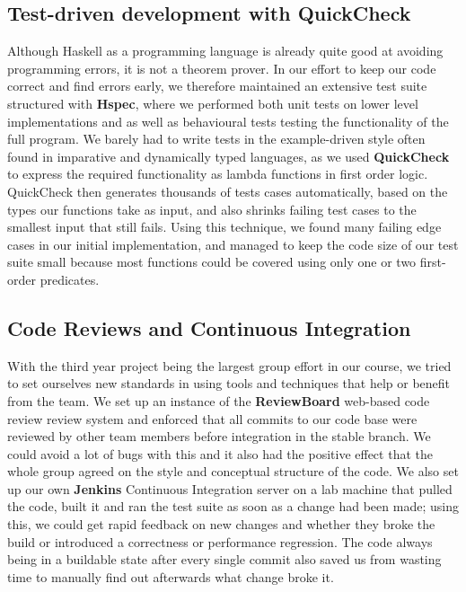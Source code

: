 \subsection*{Test-driven development with QuickCheck}
Although Haskell as a programming language is already quite good at avoiding programming errors, it is not a theorem prover.
In our effort to keep our code correct and find errors early, we therefore maintained an extensive test suite structured with \textbf{Hspec}, where we performed both unit tests on lower level implementations and as well as behavioural tests testing the functionality of the full program.
We barely had to write tests in the example-driven style often found in imparative and dynamically typed languages, as we used \textbf{QuickCheck} to express the required functionality as lambda functions in first order logic. QuickCheck then generates thousands of tests cases automatically, based on the types our functions take as input, and also shrinks failing test cases to the smallest input that still fails. Using this technique, we found many failing edge cases in our initial implementation, and managed to keep the code size of our test suite small because most functions could be covered using only one or two first-order predicates.

\subsection*{Code Reviews and Continuous Integration}
With the third year project being the largest group effort in our course, we tried to set ourselves new standards in using tools and techniques that help or benefit from the team. We set up an instance of the \textbf{ReviewBoard} web-based code review review system and enforced that all commits to our code base were reviewed by other team members before integration in the stable branch. We could avoid a lot of bugs with this and it also had the positive effect that the whole group agreed on the style and conceptual structure of the code.
We also set up our own \textbf{Jenkins} Continuous Integration server on a lab machine that pulled the code, built it and ran the test suite as soon as a change had been made; using this, we could get rapid feedback on new changes and whether they broke the build or introduced a correctness or performance regression. The code always being in a buildable state after every single commit also saved us from wasting time to manually find out afterwards what change broke it.



